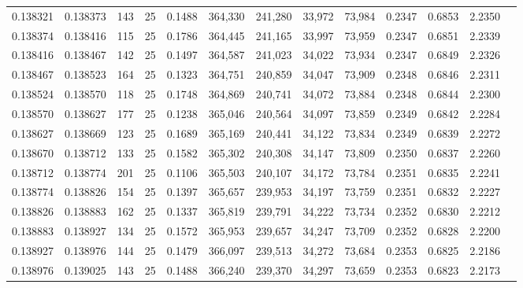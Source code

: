 \begin{tabular}{rrrrrrrrrrrrr}
0.138321 & 0.138373 &   143 &  25 &                                     0.1488 & 364,330 & 241,280 &  33,972 &  73,984 & 0.2347 & 0.6853 & 2.2350 \\
0.138374 & 0.138416 &   115 &  25 &                                     0.1786 & 364,445 & 241,165 &  33,997 &  73,959 & 0.2347 & 0.6851 & 2.2339 \\
0.138416 & 0.138467 &   142 &  25 &                                     0.1497 & 364,587 & 241,023 &  34,022 &  73,934 & 0.2347 & 0.6849 & 2.2326 \\
0.138467 & 0.138523 &   164 &  25 &                                     0.1323 & 364,751 & 240,859 &  34,047 &  73,909 & 0.2348 & 0.6846 & 2.2311 \\
0.138524 & 0.138570 &   118 &  25 &                                     0.1748 & 364,869 & 240,741 &  34,072 &  73,884 & 0.2348 & 0.6844 & 2.2300 \\
0.138570 & 0.138627 &   177 &  25 &                                     0.1238 & 365,046 & 240,564 &  34,097 &  73,859 & 0.2349 & 0.6842 & 2.2284 \\
0.138627 & 0.138669 &   123 &  25 &                                     0.1689 & 365,169 & 240,441 &  34,122 &  73,834 & 0.2349 & 0.6839 & 2.2272 \\
0.138670 & 0.138712 &   133 &  25 &                                     0.1582 & 365,302 & 240,308 &  34,147 &  73,809 & 0.2350 & 0.6837 & 2.2260 \\
0.138712 & 0.138774 &   201 &  25 &                                     0.1106 & 365,503 & 240,107 &  34,172 &  73,784 & 0.2351 & 0.6835 & 2.2241 \\
0.138774 & 0.138826 &   154 &  25 &                                     0.1397 & 365,657 & 239,953 &  34,197 &  73,759 & 0.2351 & 0.6832 & 2.2227 \\
0.138826 & 0.138883 &   162 &  25 &                                     0.1337 & 365,819 & 239,791 &  34,222 &  73,734 & 0.2352 & 0.6830 & 2.2212 \\
0.138883 & 0.138927 &   134 &  25 &                                     0.1572 & 365,953 & 239,657 &  34,247 &  73,709 & 0.2352 & 0.6828 & 2.2200 \\
0.138927 & 0.138976 &   144 &  25 &                                     0.1479 & 366,097 & 239,513 &  34,272 &  73,684 & 0.2353 & 0.6825 & 2.2186 \\
0.138976 & 0.139025 &   143 &  25 &                                     0.1488 & 366,240 & 239,370 &  34,297 &  73,659 & 0.2353 & 0.6823 & 2.2173 \\

\end{tabular}
